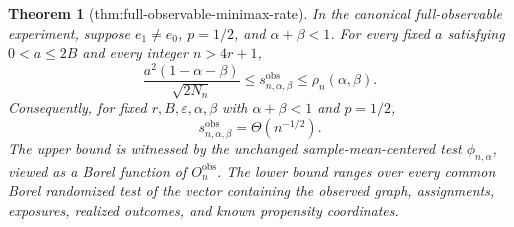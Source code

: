 \documentclass{article}
\newtheorem{theorem}{Theorem}
\begin{document}
\begin{theorem}[thm:full-observable-minimax-rate]\label{thm:full-observable-minimax-rate}
In the canonical full-observable experiment, suppose \(e_1\ne e_0\), \(p=1/2\), and \(\alpha+\beta<1\).  For every fixed \(a\) satisfying \(0<a\le2B\) and every integer \(n>4r+1\),
\[
 \frac{a^2(1-\alpha-\beta)}{\sqrt{2N_n}}
 \le s_{n,\alpha,\beta}^{\mathrm{obs}}
 \le \rho_n(\alpha,\beta).
\]
Consequently, for fixed \(r,B,\varepsilon,\alpha,\beta\) with \(\alpha+\beta<1\) and \(p=1/2\),
\[
 s_{n,\alpha,\beta}^{\mathrm{obs}}=\Theta(n^{-1/2}).
\]
The upper bound is witnessed by the unchanged sample-mean-centered test \(\phi_{n,\alpha}\), viewed as a Borel function of \(O_n^{\mathrm{obs}}\).  The lower bound ranges over every common Borel randomized test of the vector containing the observed graph, assignments, exposures, realized outcomes, and known propensity coordinates.
\end{theorem}
\end{document}
